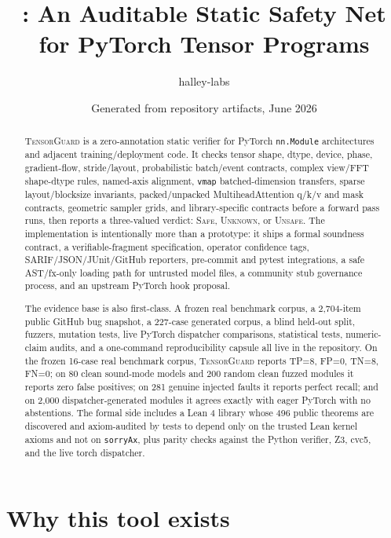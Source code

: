 \documentclass[11pt]{article}
\title{\tg: An Auditable Static Safety Net for PyTorch Tensor Programs}
\author{halley-labs}
\date{Generated from repository artifacts, June 2026}
\newcommand{\tg}{\textsc{TensorGuard}}
\newcommand{\safe}{\textsc{Safe}}
\newcommand{\unknown}{\textsc{Unknown}}
\newcommand{\unsafe}{\textsc{Unsafe}}
\begin{document}
\maketitle

\begin{abstract}
\tg{} is a zero-annotation static verifier for PyTorch \texttt{nn.Module}
architectures and adjacent training/deployment code.  It checks tensor shape,
dtype, device, phase, gradient-flow, stride/layout, probabilistic batch/event
contracts, complex view/FFT shape-dtype rules, named-axis alignment,
\texttt{vmap} batched-dimension transfers, sparse layout/blocksize invariants,
packed/unpacked MultiheadAttention q/k/v and mask contracts, geometric sampler
grids, and library-specific contracts before
a forward pass runs, then reports a
three-valued verdict:
\safe{}, \unknown{}, or \unsafe{}.  The implementation is intentionally more
than a prototype: it ships a formal soundness contract, a verifiable-fragment
specification, operator confidence tags, SARIF/JSON/JUnit/GitHub reporters,
pre-commit and pytest integrations, a safe AST/fx-only loading path for
untrusted model files, a community stub governance process, and an upstream
PyTorch hook proposal.

The evidence base is also first-class.  A frozen real benchmark corpus, a
2,704-item public GitHub bug snapshot, a 227-case generated corpus, a blind
held-out split, fuzzers, mutation tests, live PyTorch dispatcher comparisons,
statistical tests, numeric-claim audits, and a one-command reproducibility
capsule all live in the repository.  On the frozen 16-case real benchmark
corpus, \tg{} reports TP=8, FP=0, TN=8, FN=0; on 80 clean sound-mode models and
200 random clean fuzzed modules it reports zero false positives; on 281 genuine
injected faults it reports perfect recall; and on 2,000 dispatcher-generated
modules it agrees exactly with eager PyTorch with no abstentions.  The formal
side includes a Lean 4 library whose 496 public theorems are discovered and
axiom-audited by tests to depend only on the trusted Lean kernel axioms and not
on \texttt{sorryAx}, plus parity checks against the Python verifier, Z3, cvc5,
and the live torch dispatcher.
\end{abstract}

\tableofcontents
\newpage

\section{Why this tool exists}
\end{document}
